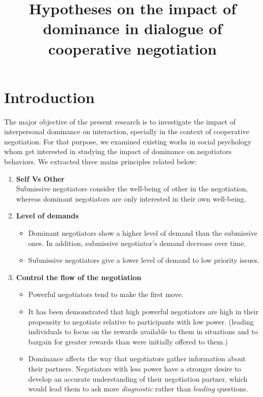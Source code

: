 \documentclass{article}
\begin{document}
		\title{\vskip -10pt Hypotheses on the impact of dominance in dialogue of cooperative negotiation}
		\maketitle
		
		
		\section{Introduction}
			The major objective of the present research is to investigate the impact of interpersonal dominance on interaction, specially in the context of cooperative negotiation. For that purpose, we examined existing works in social psychology whom get interested in studying the impact of dominance on negotiators behaviors. We extracted three mains principles related below:
			\begin{enumerate}
				\item \textbf{Self Vs Other}\\
				Submissive negotiators consider the well-being of other in the negotiation, whereas dominant negotiators are only interested in their own well-being.\cite{van2006power}
				
				\item \textbf{Level of demands}
				\begin{itemize}
					\item Dominant negotiators show a higher level of demand than the submissive ones. In addition, submissive negotiator's demand decrease over time. \cite{de1995impact}
					\item Submissive negotiators give a lower level of demand to low priority issues. \cite{de1995impact}
				\end{itemize} 
				
			\item 	\textbf{Control the flow of the negotiation}
				\begin{itemize}
					\item Powerful negotiators tend to make the first move. \cite{magee2007power}
					
					\item %
					It has been demonstrated that high powerful negotiators are high in their propensity to negotiate relative to participants with low power. (leading individuals to focus on the rewards available to them in situations and to bargain for greater rewards than were initially offered to them.)\cite{van2006power}
					
					\item Dominance affects the way that negotiators gather information about their partners. Negotiators with less power have a stronger desire to develop an accurate understanding of their negotiation partner, which would lead them to ask more \emph{diagnostic} rather than \emph{leading} questions.\cite{de2004influence}
					
				\end{itemize} 
		
			\end{enumerate}
\end{document}
